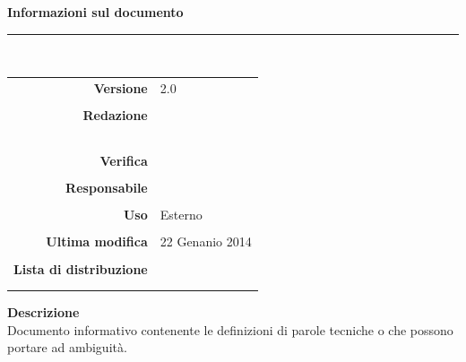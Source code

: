 \begin{titlepage}
\begin{center}
	\vspace{1cm}
	\textbf{Informazioni sul documento}\\
    \rule{10cm}{.4pt} \\
	\begin{table}[h]
	\begin{center}
	\begin{tabular}{r | l}
		\textbf{Versione} & 2.0 \\ \\
		\textbf{Redazione} & \ReAn \\
			& \GoIs \\
			& \MaMo \\
			& \CoMa \\
			& \VeFe \\ \\
		\textbf{Verifica} &\CaMa \\ \\
		\textbf{Responsabile} & \GoIs \\ \\
		\textbf{Uso} & Esterno \\ \\
		\textbf{Ultima modifica} & 22 Genanio 2014 \\ \\
		\textbf{Lista di distribuzione} & \Vardanega \\ 
		    & \Cardin \\
		    & \Zucchetti
	\end{tabular}
	\end{center}
	\end{table}
			\textbf{Descrizione} \\
			Documento informativo contenente le definizioni di parole tecniche o che possono portare ad ambiguità. 
	\end{center}
\end{titlepage}